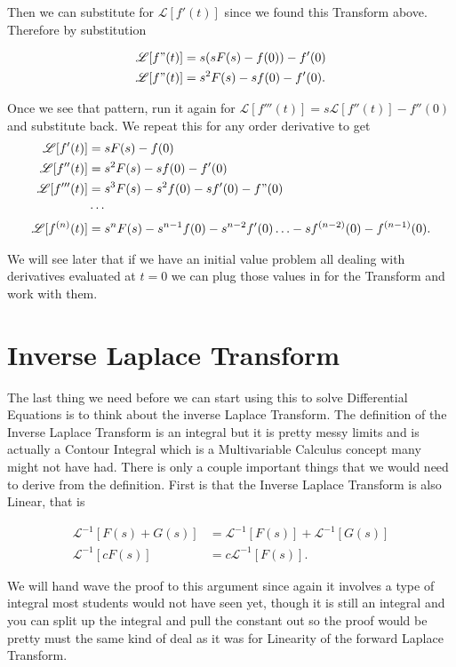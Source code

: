 \documentclass[12pt]{article}
\newcommand{\lp}{\mathscr{L}}
\begin{document}
Then we can substitute for $\lp[f'(t)]$ since we found this Transform above. Therefore by substitution

\begin{align*}
    \lp[f"(t)] &= s(sF(s)-f(0))-f'(0) \\
    \lp[f"(t)] &= s^2F(s)-sf(0)-f'(0).
\end{align*}

Once we see that pattern, run it again for $\lp[f'''(t)] = s\lp[f''(t)]-f''(0)$ and substitute back. We repeat this for any order derivative to get
\begin{align*}
    \lp[f'(t)] &=  sF(s)-f(0) \\
    \lp[f''(t)] &= s^2F(s)-sf(0)-f'(0) \\
    \lp[f'''(t)] &= s^3F(s)-s^2f(0)-sf'(0)-f"(0) \\
    & \cdots \\
    \lp[f^{(n)}(t)] &= s^nF(s)-s^{n-1}f(0)-s^{n-2}f'(0) \ldots -sf^{(n-2)}(0)-f^{(n-1)}(0).
\end{align*}

We will see later that if we have an initial value problem all dealing with derivatives evaluated at $t=0$ we can plug those values in for the Transform and work with them.

\section{Inverse Laplace Transform}

The last thing we need before we can start using this to solve Differential Equations is to think about the inverse Laplace Transform. The definition of the Inverse Laplace Transform is an integral but it is pretty messy limits and is actually a Contour Integral which is a Multivariable  Calculus concept many might not have had. There is only a couple important things that we would need to derive from the definition. First is that the Inverse Laplace Transform is also Linear, that is

\begin{align*}
    \lp^{-1}[F(s)+G(s)]&=\lp^{-1}[F(s)]+\lp^{-1}[G(s)] \\
    \lp^{-1}[cF(s)]&=c\lp^{-1}[F(s)].
\end{align*}

We will hand wave the proof to this argument since again it involves a type of integral most students would not have seen yet, though it is still an integral and you can split up the integral and pull the constant out so the proof would be pretty must the same kind of deal as it was for Linearity of the forward Laplace Transform. \\
\end{document}
